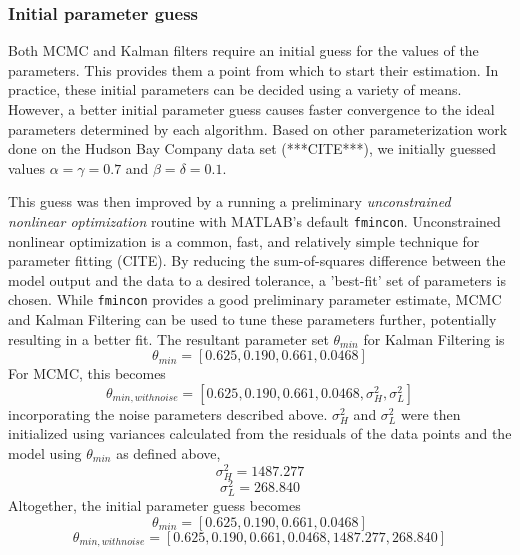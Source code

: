 \documentclass{article}
\begin{document}
\subsubsection{Initial parameter guess} \label{section:Initial_parameter_guess}
Both MCMC and Kalman filters require an initial guess for the values of the parameters. This provides them a point from which to start their estimation. In practice, these initial parameters can be decided using a variety of means. However, a better initial parameter guess causes faster convergence to the ideal parameters determined by each algorithm.
Based on other parameterization work done on the Hudson Bay Company data set (***CITE***), we initially guessed values $\alpha = \gamma = 0.7$ and $\beta = \delta = 0.1$.
\par This guess was then improved by a running a preliminary \emph{unconstrained nonlinear optimization} routine with MATLAB's default \texttt{fmincon}. Unconstrained nonlinear optimization is a common, fast, and relatively simple technique for parameter fitting (CITE). By reducing the sum-of-squares difference between the model output and the data to a desired tolerance, a 'best-fit' set of parameters is chosen. While \texttt{fmincon} provides a good preliminary parameter estimate, MCMC and Kalman Filtering can be used to tune these parameters further, potentially resulting in a better fit. The resultant parameter set $\theta_{min}$ for Kalman Filtering is 
\begin{equation}
\theta_{min} = [0.625, 0.190, 0.661, 0.0468]
\end{equation}
For MCMC, this becomes 
\begin{equation}
\theta_{min, with noise} = [0.625, 0.190, 0.661, 0.0468, \sigma_{H}^{2}, \sigma_{L}^{2}]
\end{equation} incorporating the noise parameters described above. $\sigma_{H}^{2}$ and $\sigma_{L}^{2}$ were then initialized using variances calculated from the residuals of the data points and the model using $\theta_{min}$ as defined above, 
\begin{equation}
\sigma_{H}^{2} = 1487.277
\end{equation} 
\begin{equation}
\sigma_{L}^{2} = 268.840
\end{equation}
Altogether, the initial parameter guess becomes
\begin{equation}
\theta_{min} = [0.625, 0.190, 0.661, 0.0468]
\end{equation}
\begin{equation}
\theta_{min, with noise} = [0.625, 0.190, 0.661, 0.0468, 1487.277, 268.840]
\end{equation}
\end{document}
